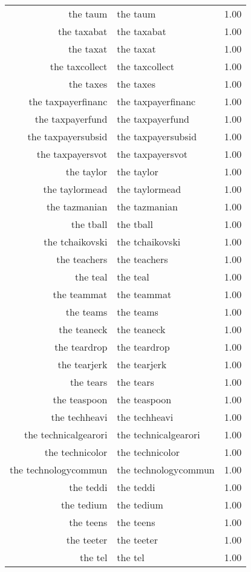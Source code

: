 \begin{table}[ht]
\begin{tabular}{rlr}
  the taum & the taum & 1.00 \\ 
  the taxabat & the taxabat & 1.00 \\ 
  the taxat & the taxat & 1.00 \\ 
  the taxcollect & the taxcollect & 1.00 \\ 
  the taxes & the taxes & 1.00 \\ 
  the taxpayerfinanc & the taxpayerfinanc & 1.00 \\ 
  the taxpayerfund & the taxpayerfund & 1.00 \\ 
  the taxpayersubsid & the taxpayersubsid & 1.00 \\ 
  the taxpayersvot & the taxpayersvot & 1.00 \\ 
  the taylor & the taylor & 1.00 \\ 
  the taylormead & the taylormead & 1.00 \\ 
  the tazmanian & the tazmanian & 1.00 \\ 
  the tball & the tball & 1.00 \\ 
  the tchaikovski & the tchaikovski & 1.00 \\ 
  the teachers & the teachers & 1.00 \\ 
  the teal & the teal & 1.00 \\ 
  the teammat & the teammat & 1.00 \\ 
  the teams & the teams & 1.00 \\ 
  the teaneck & the teaneck & 1.00 \\ 
  the teardrop & the teardrop & 1.00 \\ 
  the tearjerk & the tearjerk & 1.00 \\ 
  the tears & the tears & 1.00 \\ 
  the teaspoon & the teaspoon & 1.00 \\ 
  the techheavi & the techheavi & 1.00 \\ 
  the technicalgearori & the technicalgearori & 1.00 \\ 
  the technicolor & the technicolor & 1.00 \\ 
  the technologycommun & the technologycommun & 1.00 \\ 
  the teddi & the teddi & 1.00 \\ 
  the tedium & the tedium & 1.00 \\ 
  the teens & the teens & 1.00 \\ 
  the teeter & the teeter & 1.00 \\ 
  the tel & the tel & 1.00 \\ 

\end{tabular}
\end{table}
